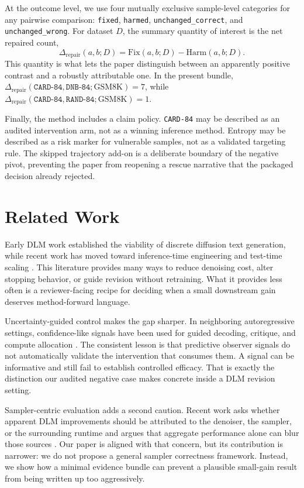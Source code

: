 \documentclass{article}
\begin{document}
At the outcome level, we use four mutually exclusive sample-level categories for any pairwise comparison: \texttt{fixed}, \texttt{harmed}, \texttt{unchanged\_correct}, and \texttt{unchanged\_wrong}. For dataset $D$, the summary quantity of interest is the net repaired count,
\[
\Delta_{\mathrm{repair}}(a,b;D) = \mathrm{Fix}(a,b;D) - \mathrm{Harm}(a,b;D).
\]
This quantity is what lets the paper distinguish between an apparently positive contrast and a robustly attributable one. In the present bundle, $\Delta_{\mathrm{repair}}(\texttt{CARD-84}, \texttt{DNB-84}; \text{GSM8K}) = 7$, while $\Delta_{\mathrm{repair}}(\texttt{CARD-84}, \texttt{RAND-84}; \text{GSM8K}) = 1$.

Finally, the method includes a claim policy. \texttt{CARD-84} may be described as an audited intervention arm, not as a winning inference method. Entropy may be described as a risk marker for vulnerable samples, not as a validated targeting rule. The skipped trajectory add-on is a deliberate boundary of the negative pivot, preventing the paper from reopening a rescue narrative that the packaged decision already rejected.

\section{Related Work}
\label{sec:related}

Early DLM work established the viability of discrete diffusion text generation, while recent work has moved toward inference-time engineering and test-time scaling \citep{radd2023,llada15,dpad2025,prophet2025,prism2026}. This literature provides many ways to reduce denoising cost, alter stopping behavior, or guide revision without retraining. What it provides less often is a reviewer-facing recipe for deciding when a small downstream gain deserves method-forward language.

Uncertainty-guided control makes the gap sharper. In neighboring autoregressive settings, confidence-like signals have been used for guided decoding, critique, and compute allocation \citep{actcabcodec2024,dontthinktwice2025,corea2026}. The consistent lesson is that predictive observer signals do not automatically validate the intervention that consumes them. A signal can be informative and still fail to establish controlled efficacy. That is exactly the distinction our audited negative case makes concrete inside a DLM revision setting.

Sampler-centric evaluation adds a second caution. Recent work asks whether apparent DLM improvements should be attributed to the denoiser, the sampler, or the surrounding runtime and argues that aggregate performance alone can blur those sources \citep{samplercentric2026}. Our paper is aligned with that concern, but its contribution is narrower: we do not propose a general sampler correctness framework. Instead, we show how a minimal evidence bundle can prevent a plausible small-gain result from being written up too aggressively.
\end{document}
